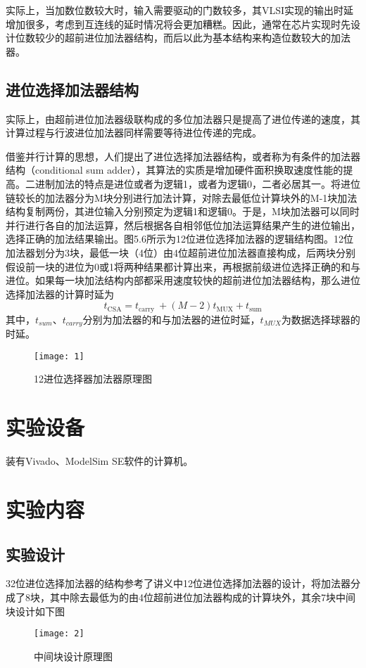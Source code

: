 \documentclass{../source/Experiment}
\begin{document}
        实际上，当加数位数较大时，输入需要驱动的门数较多，其VLSI实现的输出时延增加很多，考虑到互连线的延时情况将会更加糟糕。因此，通常在芯片实现时先设计位数较少的超前进位加法器结构，而后以此为基本结构来构造位数较大的加法器。
        \subsection{进位选择加法器结构}

        实际上，由超前进位加法器级联构成的多位加法器只是提高了进位传递的速度，其计算过程与行波进位加法器同样需要等待进位传递的完成。

        借鉴并行计算的思想，人们提出了进位选择加法器结构，或者称为有条件的加法器结构（conditional sum adder），其算法的实质是增加硬件面积换取速度性能的提高。二进制加法的特点是进位或者为逻辑1，或者为逻辑0，二者必居其一。将进位链较长的加法器分为M块分别进行加法计算，对除去最低位计算块外的M-1块加法结构复制两份，其进位输入分别预定为逻辑1和逻辑0。于是，M块加法器可以同时并行进行各自的加法运算，然后根据各自相邻低位加法运算结果产生的进位输出，选择正确的加法结果输出。图5.6所示为12位进位选择加法器的逻辑结构图。12位加法器划分为3块，最低一块（4位）由4位超前进位加法器直接构成，后两块分别假设前一块的进位为0或1将两种结果都计算出来，再根据前级进位选择正确的和与进位。如果每一块加法结构内部都采用速度较快的超前进位加法器结构，那么进位选择加法器的计算时延为
        $$
        t_{\mathrm{CSA}}=t_{\text {carry }}+(M-2) t_{\mathrm{MUX}}+t_{\mathrm{sum}}
        $$
        其中，$t_{sum}$、$t_{carry}$分别为加法器的和与加法器的进位时延，$t_{MUX}$为数据选择球器的时延。

        \begin{figure}[H]
            \centering
            \texttt{[image: 1]}
            \caption{12进位选择器加法器原理图}
        \end{figure}

        \section{实验设备}
        装有Vivado、ModelSim SE软件的计算机。
        \section{实验内容}
            \subsection{实验设计}
            32位进位选择加法器的结构参考了讲义中12位进位选择加法器的设计，将加法器分成了8块，其中除去最低为的由4位超前进位加法器构成的计算块外，其余7块中间块设计如下图
            \begin{figure}[H]
                \centering
                \texttt{[image: 2]}
                \caption{中间块设计原理图}
            \end{figure}
\end{document}
